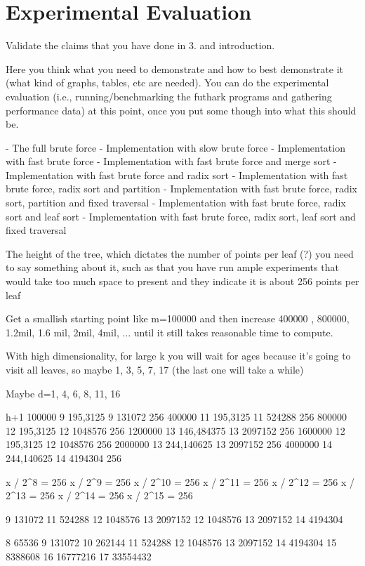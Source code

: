 \section{Experimental Evaluation}
\label{sec:eval}
Validate the claims that you have done in 3. and introduction.

Here you think what you need to demonstrate and how to best demonstrate it
(what kind of graphs, tables, etc are needed). You can do the experimental evaluation
(i.e., running/benchmarking the futhark programs and gathering performance data)
at this point, once you put some though into what this should be.


- The full brute force
- Implementation with slow brute force
- Implementation with fast brute force
- Implementation with fast brute force and merge sort
- Implementation with fast brute force and radix sort
- Implementation with fast brute force, radix sort and partition
- Implementation with fast brute force, radix sort, partition and fixed traversal
- Implementation with fast brute force, radix sort and leaf sort
- Implementation with fast brute force, radix sort, leaf sort and fixed traversal


The height of the tree, which dictates the number of points per leaf (?)  you need to say something about it, such as that you have run ample experiments that would take too much space to present and they indicate it is about 256 points per leaf


Get a smallish starting point like m=100000 and then increase 400000 , 800000, 1.2mil, 1.6 mil, 2mil, 4mil, ... until it still takes reasonable time to compute.

With high dimensionality, for large k you will wait for ages because it’s going to visit all leaves, so maybe 1, 3, 5, 7, 17 (the last one will take a while)

Maybe d=1, 4, 6, 8, 11, 16

			h+1
100000 		9		195,3125		9	131072		256
400000 		11		195,3125		11	524288		256
800000 		12		195,3125		12	1048576		256
1200000		13		146,484375		13	2097152		256
1600000		12		195,3125		12	1048576		256
2000000		13		244,140625		13	2097152		256
4000000		14		244,140625		14	4194304		256

x / 2^8 = 256
x / 2^9 = 256
x / 2^10 = 256
x / 2^11 = 256
x / 2^12 = 256
x / 2^13 = 256
x / 2^14 = 256
x / 2^15 = 256


9	131072
11	524288
12	1048576
13	2097152
12	1048576
13	2097152
14	4194304

8	65536
9	131072
10	262144
11	524288
12	1048576
13	2097152
14	4194304
15	8388608
16	16777216
17	33554432



